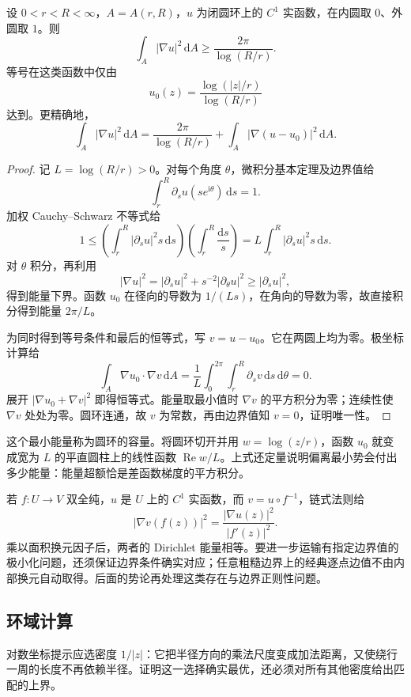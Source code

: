 \begin{proposition}\label{b3:prop:08-annulus-capacity}
设 \(0<r<R<\infty\)，\(A=A(r,R)\)，\(u\) 为闭圆环上的 \(C^1\) 实函数，在内圆取 \(0\)、外圆取 \(1\)。则
\[
 \int_A|\nabla u|^2\,\mathrm dA\ge\frac{2\pi}{\log(R/r)}.
\]
等号在这类函数中仅由
\[
 u_0(z)=\frac{\log(|z|/r)}{\log(R/r)}
\]
达到。更精确地，
\[
 \int_A|\nabla u|^2\,\mathrm dA
 =\frac{2\pi}{\log(R/r)}
  +\int_A|\nabla(u-u_0)|^2\,\mathrm dA.
\]
\end{proposition}
\begin{proof}
记 \(L=\log(R/r)>0\)。对每个角度 \(\theta\)，微积分基本定理及边界值给
\[
 \int_r^R\partial_su(se^{\mathrm i\theta})\,\mathrm ds=1.
\]
加权 Cauchy--Schwarz 不等式给
\[
 1\le
 \left(\int_r^R|\partial_su|^2s\,\mathrm ds\right)
 \left(\int_r^R\frac{\mathrm ds}{s}\right)
 =L\int_r^R|\partial_su|^2s\,\mathrm ds.
\]
对 \(\theta\) 积分，再利用
\[
 |\nabla u|^2=|\partial_su|^2+s^{-2}|\partial_\theta u|^2
 \ge|\partial_su|^2,
\]
得到能量下界。函数 \(u_0\) 在径向的导数为 \(1/(Ls)\)，在角向的导数为零，故直接积分得到能量 \(2\pi/L\)。

为同时得到等号条件和最后的恒等式，写 \(v=u-u_0\)。它在两圆上均为零。极坐标计算给
\[
 \int_A\nabla u_0\cdot\nabla v\,\mathrm dA
 =\frac1L\int_0^{2\pi}\int_r^R\partial_sv\,\mathrm ds\,\mathrm d\theta
 =0.
\]
展开 \(|\nabla u_0+\nabla v|^2\) 即得恒等式。能量取最小值时 \(\nabla v\) 的平方积分为零；连续性使 \(\nabla v\) 处处为零。圆环连通，故 \(v\) 为常数，再由边界值知 \(v=0\)，证明唯一性。
\end{proof}
这个最小能量称为圆环的容量。将圆环切开并用 \(w=\log(z/r)\)，函数 \(u_0\) 就变成宽为 \(L\) 的平直圆柱上的线性函数 \(\operatorname{Re}w/L\)。上式还定量说明偏离最小势会付出多少能量：能量超额恰是差函数梯度的平方积分。

\ProseParagraphBreak
若 \(f:U\rightarrow V\) 双全纯，\(u\) 是 \(U\) 上的 \(C^1\) 实函数，而 \(v=u\circ f^{-1}\)，链式法则给
\[
 |\nabla v(f(z))|^2=\frac{|\nabla u(z)|^2}{|f'(z)|^2}.
\]
乘以面积换元因子后，两者的 Dirichlet 能量相等。要进一步运输有指定边界值的极小化问题，还须保证边界条件确实对应；任意粗糙边界上的经典逐点边值不由内部换元自动取得。后面的势论再处理这类存在与边界正则性问题。

\subsection{环域计算}
\label{b3:subsec:080304}

对数坐标提示应选密度 \(1/|z|\)：它把半径方向的乘法尺度变成加法距离，又使绕行一周的长度不再依赖半径。证明这一选择确实最优，还必须对所有其他密度给出匹配的上界。

